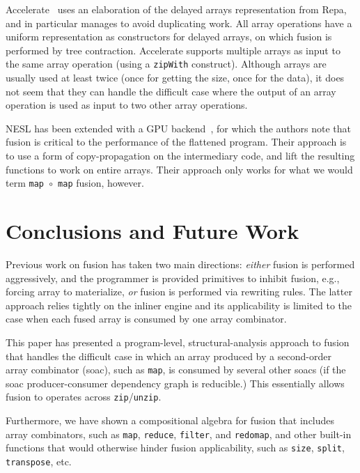 \documentclass{sigplanconf}  %
\begin{document}
Accelerate~\cite{mcdonell2013optimising} uses an elaboration of the
delayed arrays representation from Repa, and in particular manages to
avoid duplicating work.  All array operations have a uniform
representation as constructors for delayed arrays, on which fusion is
performed by tree contraction.  Accelerate supports multiple arrays as
input to the same array operation (using a {\tt zipWith} construct).
Although arrays are usually used at least twice (once for getting the
size, once for the data), it does not seem that they can handle the difficult
case where the output of an array operation is used as input to two
other array operations.

NESL has been extended with a GPU backend~\cite{bergstrom2012nested},
for which the authors note that fusion is critical to the performance
of the flattened program.  Their approach is to use a form of
copy-propagation on the intermediary code, and lift the resulting
functions to work on entire arrays.  Their approach only works for
what we would term {\tt map $\circ$ map} fusion, however.

\section{Conclusions and Future Work}
\label{sec:Concl}

Previous work on fusion has taken two main directions:
{\em either} fusion is performed aggressively, 
and the programmer is provided primitives to inhibit fusion, 
e.g., forcing array to materialize, {\em or} fusion is 
performed via rewriting rules.  The latter approach 
relies tightly on the inliner engine and its applicability 
is limited to the case when each fused array is consumed 
by one array combinator. 

This paper has presented a program-level, structural-analysis 
approach to fusion that handles the difficult case in which 
an array produced by a second-order array combinator ({\sc soac}), 
such as {\tt map}, is consumed by several other {\sc soac}s
(if the {\sc soac} producer-consumer dependency graph
is reducible.)   This essentially allows fusion to operates
across {\tt zip}/{\tt unzip}. 

Furthermore, we have shown
a compositional algebra for fusion that includes 
array combinators, such as {\tt map}, {\tt reduce}, 
{\tt filter}, and {\tt redomap}, and other built-in
functions that would otherwise hinder fusion applicability,
such as {\tt size}, {\tt split}, {\tt transpose}, etc.
\end{document}
